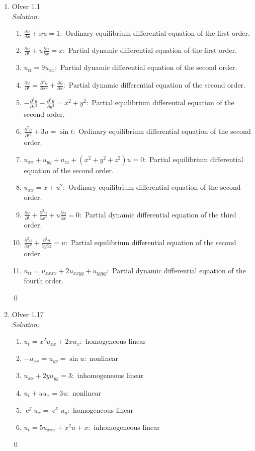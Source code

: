 \documentclass[10pt]{amsart}
\DeclareMathOperator{\E}{e}
\theoremstyle{nonumberplain}
\begin{document}
\begin{enumerate}[label={\bf {\arabic*}:}]
\item Olver 1.1 \\
\textit{Solution:}
\begin{enumerate}
\item $\frac {du}{dx} + xu = 1:$ \quad Ordinary equilibrium differential equation of the first order.
\item $\frac {\partial u}{\partial t} + u \frac{\partial u }{\partial x} = x:$ \quad Partial dynamic differential equation of the first order.
\item $u_{tt} = 9u_{xx}:$ \quad Partial dynamic differential equation of the second order.
\item $\frac {\partial u}{\partial t} = \frac{\partial^2 u }{\partial x^2} + \frac{\partial u }{\partial x}:$ \quad Partial dynamic differential equation of the second order.
\item $- \frac{\partial^2 u }{\partial x^2} - \frac{\partial^2 u }{\partial y^2} = x^2 + y^2:$ \quad Partial equilibrium differential equation of the second order.
\item $\frac{\partial^2 u }{\partial t^2} + 3u = \sin t:$ \quad Ordinary equilibrium differential equation of the second order.
\item $u_{xx} + u_{yy} + u_{zz} + (x^2 + y^2 + z^2)u = 0:$ \quad Partial equilibrium differential equation of the second order.
\item $u_{xx} = x + u^2:$ \quad Ordinary equilibrium differential equation of the second order.
\item $\frac{\partial u }{\partial t} + \frac{\partial^3 u }{\partial x^3} + u \frac{\partial u }{\partial x} = 0:$ \quad Partial dynamic differential equation of the third order.
\item $\frac{\partial^2 u }{\partial x^2} + \frac{\partial^2 u }{\partial y \partial z} = u:$ \quad Partial equilibrium differential equation of the second order.
\item $u_{tt} = u_{xxxx} + 2u_{xxyy} + u_{yyyy}:$ \quad Partial dynamic differential equation of the fourth order.
\end{enumerate}
\qed \\

\item Olver 1.17 \\
\textit{Solution:}
\begin{enumerate}
\item $u_t = x^2u_{xx} + 2xu_x:$ \quad homogeneous linear
\item $-u_{xx} = u_{yy} = \sin u:$ \quad nonlinear
\item $u_{xx} + 2yu_{yy} = 3:$ \quad inhomogeneous linear
\item $u_t + uu_x = 3u:$ \quad nonlinear
\item $\E^yu_x = \E^xu_y:$ \quad homogeneous linear
\item $u_t = 5u_{xxx} + x^2u + x:$ \quad inhomogeneous linear
\end{enumerate}
\qed \\
\newpage


\end{enumerate}
\end{document}
